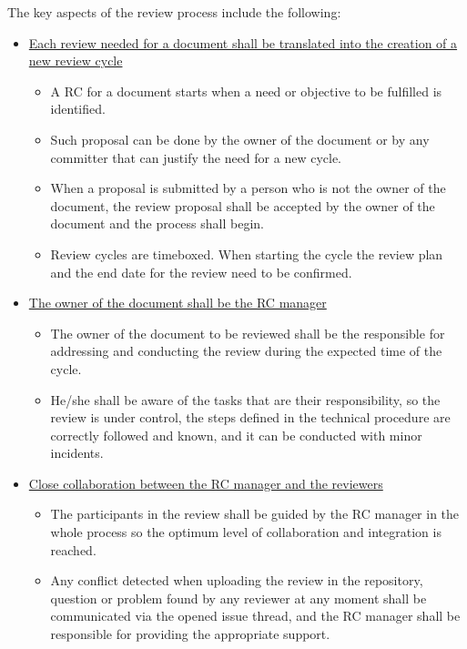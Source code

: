 \documentclass{template/openetcs_article}
\begin{document}
The key aspects of the review process include the following:

\begin{itemize}
\item \underline{Each review needed for a document shall be translated into the creation of a new review cycle}
\begin{itemize}
\item A RC for a document starts when a need or objective to be fulfilled is identified.
\item Such proposal can be done by the owner of the document or by any committer that can justify the need for a new cycle. 
\item When a proposal is submitted by a person who is not the owner of the document, the review proposal shall be accepted by the owner of the document and the process shall begin.
\begin{minipage}{9cm} \end{minipage}
\item Review cycles are timeboxed. When starting the cycle the review plan and the end date for the review need to be confirmed. 
\begin{minipage}{9cm} \end{minipage}
\end{itemize}
\item \underline{The owner of the document shall be the RC manager}
\begin{itemize}
\item The owner of the document to be reviewed shall be the responsible for addressing and conducting the review during the expected time of the cycle. 
\item He/she shall be aware of the tasks that are their responsibility, so the review is under control, the steps defined in the technical procedure are correctly followed and known, and it can be conducted with minor incidents. 
\end{itemize}

\item \underline{Close collaboration between the RC manager and the reviewers}
\begin{itemize}
\item The participants in the review shall be guided by the RC manager in the whole process so the optimum level of collaboration and integration is reached. 
\item Any conflict detected when uploading the review in the repository, question or problem found by any reviewer at any moment shall be communicated via the opened issue thread, and the RC manager shall be responsible for providing the appropriate support.
\end{itemize}


\end{itemize}
\end{document}
